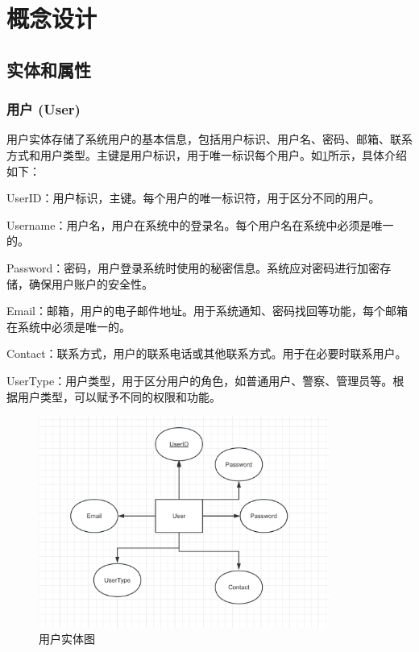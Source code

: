 \section{概念设计}

\subsection{实体和属性}

\subsubsection{用户 (User)}

用户实体存储了系统用户的基本信息，包括用户标识、用户名、密码、邮箱、联系方式和用户类型。主键是用户标识，用于唯一标识每个用户。如\cref{fig:entity-user}所示，具体介绍如下：

UserID：用户标识，主键。每个用户的唯一标识符，用于区分不同的用户。

Username：用户名，用户在系统中的登录名。每个用户名在系统中必须是唯一的。

Password：密码，用户登录系统时使用的秘密信息。系统应对密码进行加密存储，确保用户账户的安全性。

Email：邮箱，用户的电子邮件地址。用于系统通知、密码找回等功能，每个邮箱在系统中必须是唯一的。

Contact：联系方式，用户的联系电话或其他联系方式。用于在必要时联系用户。

UserType：用户类型，用于区分用户的角色，如普通用户、警察、管理员等。根据用户类型，可以赋予不同的权限和功能。

\begin{figure}[htbp]
    \centering
    \includegraphics[width=0.85\textwidth]{figures/db-img-01.png}
    \caption{用户实体图}
    \label{fig:entity-user}
\end{figure}

